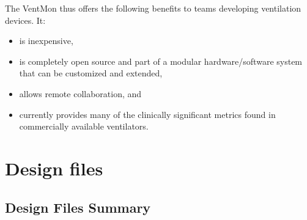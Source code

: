 \documentclass[11pt, letterpaper]{article}
\begin{document}
The VentMon thus offers the following benefits to teams developing ventilation devices. It:
\begin{itemize}
\item is inexpensive,
\item is completely open source and part of a modular hardware/software system that can be customized and extended,
\item allows remote collaboration, and
\item currently provides many of the clinically significant metrics found in commercially available ventilators.
\end{itemize}

\section{Design files}

\subsection{Design Files Summary}
\end{document}

